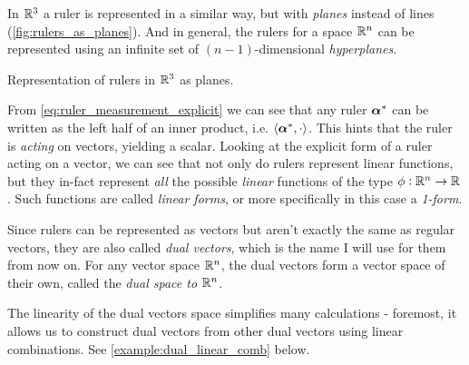 In $\Rs[3]$ a ruler is represented in a similar way, but with \textit{planes} instead of lines (\autoref{fig:rulers_as_planes}). And in general, the rulers for a space $\Rs[n]$ can be represented using an infinite set of $(n-1)$-dimensional \textit{hyperplanes}.

\begin{marginfigure}
    \begin{center}
    \end{center}
    \caption{Representation of rulers in $\Rs[3]$ as planes.}
    \label{fig:rulers_as_planes}
\end{marginfigure}

From \autoref{eq:ruler_measurement_explicit} we can see that any ruler $\dualvec{\alpha}$ can be written as the left half of an inner product, i.e. $\inner{\dualvec{\alpha}}{\cdot}$. This hints that the ruler is \textit{acting} on vectors, yielding a scalar. Looking at the explicit form of a ruler acting on a vector, we can see that not only do rulers represent linear functions, but they in-fact represent \textit{all} the possible \textit{linear} functions of the type $\phi:\Rs[n]\to\Rs$. Such functions are called \textit{linear forms}, or more specifically in this case a \textit{1-form}.

Since rulers can be represented as vectors but aren't exactly the same as regular vectors, they are also called \textit{dual vectors}, which is the name I will use for them from now on. For any vector space $\Rs[n]$, the dual vectors form a vector space of their own, called the \textit{dual space to $\Rs[n]$}.

The linearity of the dual vectors space simplifies many calculations - foremost, it allows us to construct dual vectors from other dual vectors using linear combinations. See \autoref{example:dual_linear_comb} below.

